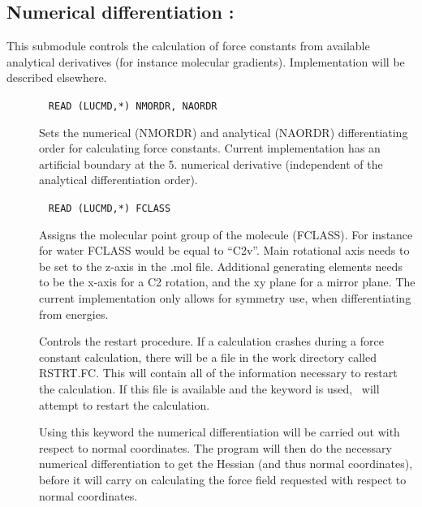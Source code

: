\subsection{Numerical differentiation : }

This submodule controls the calculation of force constants from
available analytical derivatives (for instance molecular
gradients). Implementation will be described elsewhere. 

\begin{description}

\item[]\verb| |\newline
\verb|READ (LUCMD,*) NMORDR, NAORDR|

Sets the numerical (NMORDR) and analytical (NAORDR) differentiating
order for calculating force constants. Current implementation has an
artificial boundary at the 5. numerical derivative (independent of the
analytical differentiation order).

\item[]\verb| |\newline
\verb|READ (LUCMD,*) FCLASS|

Assigns the molecular point group of the molecule (FCLASS). For
instance for water FCLASS would be equal to ``C2v''. Main rotational
axis needs to be set to the z-axis in the .mol file. Additional
generating elements needs to be the x-axis for a C2 rotation, and the
xy plane for a mirror plane. The current implementation only allows
for symmetry use, when differentiating from energies. 

\item[]
Controls the restart procedure. If a calculation crashes during a
force constant calculation, there will be a file in the work directory
called RSTRT.FC. This will contain all of the information necessary to
restart the calculation. If this file is available and the keyword is
used, \dalton\ will attempt to restart the calculation. 

\item[]
Using this keyword the numerical differentiation will be carried out
with respect to normal coordinates. The program will then do the
necessary numerical differentiation to get the Hessian (and thus
normal coordinates), before it will carry on calculating the force
field requested with respect to normal coordinates.

\end{description}

